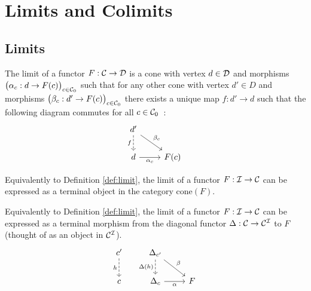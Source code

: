 \section{Limits and Colimits}

\subsection{Limits}

\begin{definition}
	The limit of a functor $F:\mathcal{C}\to \mathcal{D}$ is a cone with vertex $d\in \mathcal{D}$ and
	morphisms $\big(\alpha_c: d \to F(c)\big)_{c\in \mathcal{C}_0}$ such that for any other
	cone with vertex $d'\in D$ and morphisms $\big(\beta_c: d' \to F(c)\big)_{c\in
	\mathcal{C}_0}$ there exists a unique map $f:d'\to d$ such that the following diagram
	commutes for all $c\in
	\mathcal{C}_0$~\parencite[p.~118]{leinster:basic_category_theory}:
	\[\begin{tikzcd}
		{d'} \\
		d & {F(c)}
		\arrow["{\alpha_c}"', from=2-1, to=2-2]
		\arrow["{\beta_c}", from=1-1, to=2-2]
		\arrow["f"', dashed, from=1-1, to=2-1]
	\end{tikzcd}\]
\end{definition}

\begin{definition}
	Equivalently to Definition \ref{def:limit}, the limit of a functor $F:\mathcal{I}\to
	\mathcal{C}$ can be expressed as a terminal object in the category $\mathrm{cone}(F)$.
\end{definition}

\begin{definition}
	Equivalently to Definition \ref{def:limit}, the limit of a functor $F:\mathcal{I}\to
	\mathcal{C}$ can be expressed as a terminal morphism from the diagonal functor $\Delta:
	\mathcal{C} \to \mathcal{C}^{\mathcal{I}}$ to $F$ (thought of as an object in $\mathcal{C}^{\mathcal{I}}$).
	\[\begin{tikzcd}[ampersand replacement=\&]
		{c'} \& {\Delta_{c'}} \\
		c \& {\Delta_c} \& F
		\arrow["h"', dashed, from=1-1, to=2-1]
		\arrow["{\Delta(h)}"', dashed, from=1-2, to=2-2]
		\arrow["\beta", from=1-2, to=2-3]
		\arrow["\alpha"', from=2-2, to=2-3]
	\end{tikzcd}\]
\end{definition}

